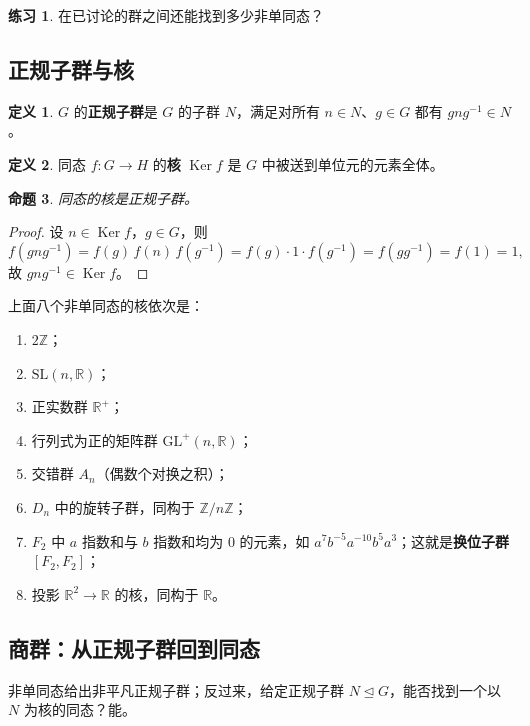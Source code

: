 \documentclass[11pt,a4paper]{article}
\theoremstyle{definition}
\newtheorem{definition}{定义}[section]
\newtheorem{exercise}{练习}
\theoremstyle{plain}
\newtheorem{proposition}[definition]{命题}
\theoremstyle{remark}
\newcommand{\Z}{\mathbb{Z}}
\newcommand{\R}{\mathbb{R}}
\newcommand{\GL}{\mathrm{GL}}
\newcommand{\SL}{\mathrm{SL}}
\DeclareMathOperator{\Ker}{Ker}
\begin{document}
\begin{exercise}
在已讨论的群之间还能找到多少非单同态？
\end{exercise}

\subsection{正规子群与核}

\begin{definition}
$G$ 的\textbf{正规子群}是 $G$ 的子群 $N$，满足对所有 $n\in N$、$g\in G$ 都有 $gng^{-1}\in N$。
\end{definition}

\begin{definition}
同态 $f:G\to H$ 的\textbf{核} $\Ker f$ 是 $G$ 中被送到单位元的元素全体。
\end{definition}

\begin{proposition}
同态的核是正规子群。
\end{proposition}
\begin{proof}
设 $n\in\Ker f$，$g\in G$，则
\[
  f(gng^{-1}) = f(g)\,f(n)\,f(g^{-1}) = f(g)\cdot 1\cdot f(g^{-1}) = f(gg^{-1}) = f(1) = 1,
\]
故 $gng^{-1}\in\Ker f$。
\end{proof}

上面八个非单同态的核依次是：
\begin{enumerate}[nosep]
  \item $2\Z$；
  \item $\SL(n,\R)$；
  \item 正实数群 $\R^{+}$；
  \item 行列式为正的矩阵群 $\GL^{+}(n,\R)$；
  \item 交错群 $A_n$（偶数个对换之积）；
  \item $D_n$ 中的旋转子群，同构于 $\Z/n\Z$；
  \item $F_2$ 中 $a$ 指数和与 $b$ 指数和均为 $0$ 的元素，如 $a^7b^{-5}a^{-10}b^5a^3$；这就是\textbf{换位子群} $[F_2,F_2]$；
  \item 投影 $\R^2\to\R$ 的核，同构于 $\R$。
\end{enumerate}

\subsection{商群：从正规子群回到同态}

非单同态给出非平凡正规子群；反过来，给定正规子群 $N\trianglelefteq G$，能否找到一个以 $N$ 为核的同态？能。
\end{document}
